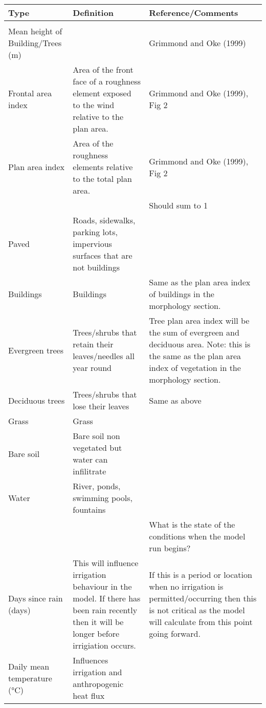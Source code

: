 \documentclass[letterpaper,10pt,english]{sphinxmanual}
\begin{document}
\begin{savenotes}\sphinxattablestart
\centering
\begin{tabulary}{\linewidth}[t]{|T|T|T|}
\hline
\sphinxstyletheadfamily 
Type
&\sphinxstyletheadfamily 
Definition
&\sphinxstyletheadfamily 
Reference/Comments
\\
\hline&
&\\
\hline
Mean height of
Building/Trees (m)
&&
Grimmond and Oke
(1999)
\\
\hline
Frontal area index
&
Area of the front
face of a roughness
element exposed to
the wind relative to
the plan area.
&
Grimmond and Oke
(1999), Fig 2
\\
\hline
Plan area index
&
Area of the roughness
elements relative to
the total plan area.
&
Grimmond and Oke
(1999), Fig 2
\\
\hline&
&
Should sum to 1
\\
\hline
Paved
&
Roads, sidewalks,
parking lots,
impervious surfaces
that are not
buildings
&\\
\hline
Buildings
&
Buildings
&
Same as the plan area
index of buildings in
the morphology
section.
\\
\hline
Evergreen trees
&
Trees/shrubs that
retain their
leaves/needles all
year round
&
Tree plan area index
will be the sum of
evergreen and
deciduous area. Note:
this is the same as
the plan area index
of vegetation in the
morphology section.
\\
\hline
Deciduous trees
&
Trees/shrubs that
lose their leaves
&
Same as above
\\
\hline
Grass
&
Grass
&\\
\hline
Bare soil
&
Bare soil \textendash{} non
vegetated but water
can infilitrate
&\\
\hline
Water
&
River, ponds,
swimming pools,
fountains
&\\
\hline&
&
What is the state of
the conditions when
the model run begins?
\\
\hline
Days since rain
(days)
&
This will influence
irrigation behaviour
in the model. If
there has been rain
recently then it will
be longer before
irrigiation occurs.
&
If this is a period
or location when no
irrigation is
permitted/occurring
then this is not
critical as the model
will calculate from
this point going
forward.
\\
\hline
Daily mean
temperature (°C)
&
Influences irrigation
and anthropogenic
heat flux

\end{tabulary}
\end{savenotes}
\end{document}
